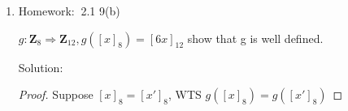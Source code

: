 \documentclass[12pt]{article}
\newcommand{\solu}{{\color{blue} Solution:}}
\newcommand{\hw}{{\color{red} Homework: $\ $}}
\newcommand{\Z}{\mathbf{Z}}
\begin{document}
\begin{enumerate}
\begin{enumerate}
        $\alpha = \begin{pmatrix}
            1 & 2 & 3 & 4 & 5 \\
            3 & 4 & 1 & 2 & 5
        \end{pmatrix}$\\
        $\beta = \begin{pmatrix}
            1 & 2 & 3 & 4 & 5 \\
            5 & 1 & 4 & 3 & 2
        \end{pmatrix}$

        Find $\alpha\beta$ (composition of $\alpha$ and $\beta$), $\alpha^{-1}$

        \solu 

        $(\alpha\beta)(1) = \alpha(\beta(1)) = \alpha(5) = 5$\\
        $(\alpha\beta)(2) = \alpha(\beta(2)) = \alpha(1) = 3$\\
        $(\alpha\beta)(3) = \alpha(\beta(3)) = \alpha(4) = 2$\\
        $(\alpha\beta)(4) = \alpha(\beta(4)) = \alpha(5) = 1$\\
        $(\alpha\beta)(5) = \alpha(\beta(5)) = \alpha(2) = 4$

        Then, $\alpha\beta = \begin{pmatrix}
            1 & 2 & 3 & 4 & 5 \\
            5 & 3 & 2 & 1 & 4
        \end{pmatrix}$

        $\alpha^{-1} = \begin{pmatrix}
            3 & 4 & 1 & 2 & 5 \\
            1 & 2 & 3 & 4 & 5
        \end{pmatrix}$\\
        rearrange:\\
        $\alpha^{-1} = \begin{pmatrix}
            1 & 2 & 3 & 4 & 5 \\
            3 & 4 & 1 & 2 & 5
        \end{pmatrix}$

        \item \hw 2.1 9(b) 
        
        $g : \Z_8 \Rightarrow \Z_12, g([x]_8) = [6x]_12$ show that g is well defined.
        
        \solu

        \begin{proof}
        Suppose $[x]_8 = [x']_8$, WTS $g([x]_8) = g([x']_8)$


\end{proof}
\end{enumerate}
\end{enumerate}
\end{document}
